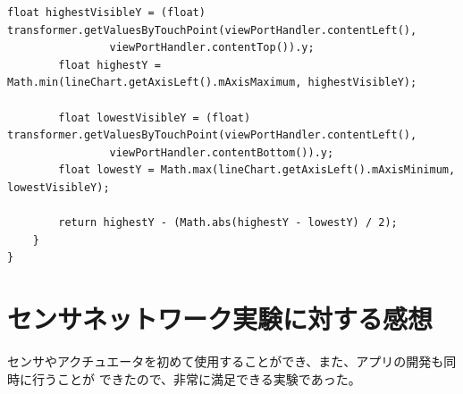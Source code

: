 \documentclass[dvipdfmx,autodetect-engine,titlepage]{jsarticle}
\begin{document}
\begin{lstlisting}[caption=Java.py,label=Java]
        float highestVisibleY = (float) transformer.getValuesByTouchPoint(viewPortHandler.contentLeft(),
                viewPortHandler.contentTop()).y;
        float highestY = Math.min(lineChart.getAxisLeft().mAxisMaximum, highestVisibleY);

        float lowestVisibleY = (float) transformer.getValuesByTouchPoint(viewPortHandler.contentLeft(),
                viewPortHandler.contentBottom()).y;
        float lowestY = Math.max(lineChart.getAxisLeft().mAxisMinimum, lowestVisibleY);

        return highestY - (Math.abs(highestY - lowestY) / 2);
    }
}
  \end{lstlisting}

\section{センサネットワーク実験に対する感想}
センサやアクチュエータを初めて使用することができ、また、アプリの開発も同時に行うことが
できたので、非常に満足できる実験であった。
\end{document}
